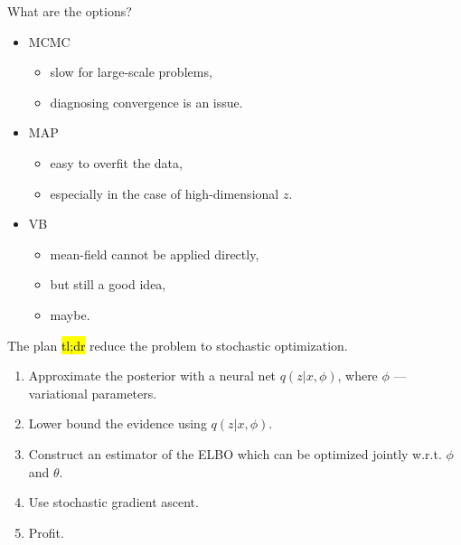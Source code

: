 \documentclass[unicode,11pt]{beamer}
\begin{document}
\begin{frame}{What are the options?}
  \begin{itemize}
  \item MCMC
    \begin{itemize}
    \item slow for large-scale problems,
    \item diagnosing convergence is an issue.
    \end{itemize}
  \item MAP
    \begin{itemize}
    \item easy to overfit the data,
    \item especially in the case of high-dimensional $z$.
    \end{itemize}
  \item VB
    \begin{itemize}
    \item mean-field cannot be applied directly,
    \item but still a good idea,
    \item maybe.
    \end{itemize}
  \end{itemize}
\end{frame}


\begin{frame}{The plan}
  \hl{tl;dr} reduce the problem to stochastic optimization.

  \begin{enumerate}
  \item Approximate the posterior with a neural net
    $q(z|x, \phi)$, where $\phi$ --- variational parameters.
  \item Lower bound the evidence using $q(z|x, \phi)$.
  \item Construct an estimator of the ELBO which can be
    optimized jointly w.r.t. $\phi$ and $\theta$.
  \item Use stochastic gradient ascent.
  \item Profit.
  \end{enumerate}
\end{frame}
\end{document}
